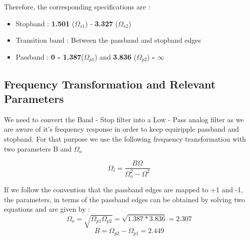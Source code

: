 \documentclass{article}
\begin{document}
Therefore, the corresponding specifications are :
\begin{itemize}
    \item Stopband :  \textbf{1.501} ($\Omega_{s1}$) - \textbf{3.327} ($\Omega_{s2}$)
    \item  Transition band : Between the passband and stopband edges
    \item Passband : \textbf{0 - 1.387}($\Omega_{p1}$) and \textbf{3.836} ($\Omega_{p2}$) \textbf{- $\infty$}
\end{itemize}

\subsection{Frequency Transformation and Relevant Parameters}
We need to convert the Band - Stop filter into a Low - Pass analog filter as we are aware of it's frequency response in order to keep equiripple passband and stopband. For that purpose we use the following frequency transformation with two parameters B and $\Omega_o$

\begin{equation*}
    \Omega_l = \frac{B\Omega}{\Omega_o^2 - \Omega^2}
\end{equation*}

\vspace{1em}
\noindent
If we follow the convention that the passband edges are mapped to +1 and -1, the parameters, in terms of the passband edges can be obtained by solving two equations and are given by :
\begin{equation*}
    \Omega_o = \sqrt{\Omega_{p1} \Omega_{p2}} = \sqrt{1.387*3.836} = 2.307
\end{equation*}\begin{equation*}
    B = \Omega_{p2}  - \Omega_{p1} = 2.449
\end{equation*}
\end{document}
